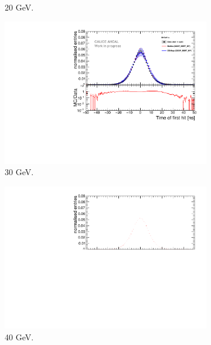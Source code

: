 \begin{figure}[htbp!]
\begin{subfigure}[t]{0.49\textwidth}
    \caption{20 GeV.}\label{fig:elec_sim_data_20GeV}
  \end{subfigure}
  \hfill
  \begin{subfigure}[t]{0.49\textwidth}
    \centering
    \includegraphics[width=1\textwidth]{../Thesis_Plots/Timing/Electrons/Plots/Comparison_SimData_Electrons30GeV.pdf}
    \caption{30 GeV.}\label{fig:elec_sim_data_30GeV}
  \end{subfigure}
  \hfill
  \begin{subfigure}[t]{0.49\textwidth}
    \centering
    \includegraphics[width=1\textwidth]{../Thesis_Plots/Timing/Electrons/Plots/Comparison_SimData_Electrons40GeV.pdf}
    \caption{40 GeV.}\label{fig:elec_sim_data_40GeV}
  \end{subfigure}
  \hfill
  \begin{subfigure}[t]{0.49\textwidth}

\end{subfigure}
\end{figure}
